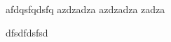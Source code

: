 \documentclass{article}
\begin{document}
afdqsfqdsfq
azdzadza
azdzadza
zadza

dfsdfdsfsd
\end{document}
